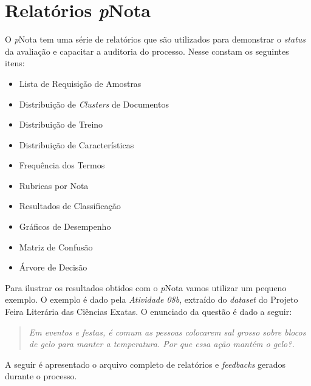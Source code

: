 %
%
\chapter{Relatórios \textit{p}Nota}
\label{exemplo-pNota}

O \textit{p}Nota tem uma série de relatórios que são utilizados para demonstrar o \textit{status} da avaliação e capacitar a auditoria do processo. Nesse constam os seguintes itens:

\begin{itemize}
\item Lista de Requisição de Amostras
\item Distribuição de \textit{Clusters} de Documentos
\item Distribuição de Treino
\item Distribuição de Características
\item Frequência dos Termos
\item Rubricas por Nota
\item Resultados de Classificação
\item Gráficos de Desempenho
\item Matriz de Confusão
\item Árvore de Decisão
\end{itemize}

Para ilustrar os resultados obtidos com o \textit{p}Nota vamos utilizar um pequeno exemplo. O exemplo é dado pela \textit{Atividade 08b}, extraído do \textit{dataset} do Projeto Feira Literária das Ciências Exatas. O enunciado da questão é dado a seguir:

\begin{quote}
\textit{Em eventos e festas, é comum as pessoas colocarem sal grosso sobre blocos de gelo para manter a temperatura. Por que essa ação mantém o gelo?.}
\end{quote}

A seguir é apresentado o arquivo completo de relatórios e \textit{feedbacks} gerados durante o processo.

